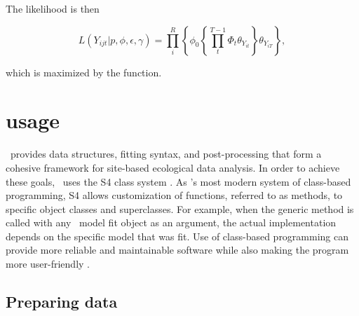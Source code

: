 \documentclass[article,shortnames]{jss}
\newcommand{\um}{\pkg{unmarked}}
\newcommand{\rlang}{\proglang{R}}
\begin{document}
The likelihood is then

\begin{equation}
L(Y_{ijt}| p,\phi,\epsilon,\gamma) = 
 \prod_{i}^{R} \left\{
    \phi_0 \left\{ \prod_{t}^{T-1} \Phi_t \theta_{Y_{it}}  
        \right\} \theta_{Y_{iT}} \right\},
\end{equation}

which is maximized by the  function. 



 

\section[unmarked usage]{ usage}
\label{sec:unmarked-usage}

\um\ provides data structures, fitting syntax, and post-processing that form a
cohesive framework for site-based ecological data analysis.  In order
to achieve these goals, \um\ uses the S4 class system
\citep{Chambers2008}. As \rlang's most modern system of class-based
programming, S4 allows customization of functions, referred to as
methods, to specific object classes and superclasses. For example,
when the generic  method is called with any \um\ model
fit object as an argument, the actual  implementation
depends on the specific model that was fit.  Use of class-based
programming can provide more reliable and maintainable software while
also making the program more user-friendly \citep{Chambers2008}.


\subsection{Preparing data}
\label{sec:data-requirements}
\end{document}
